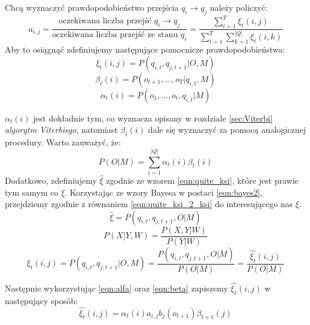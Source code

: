 \documentclass[shortabstract, mgr]{iithesis}
\begin{document}
	   Chcą wyznaczyć prawdopodobieństwo przejścia $q_i \rightarrow q_j$ należy policzyć:
	   \begin{equation}
		    a_{i,j}=\frac{\text{oczekiwana liczba przejść } q_i \rightarrow q_j}{\text{oczekiwana liczba przejść ze stanu } q_i} = \frac{\sum_{t=1}^T 	\xi_t(i,j)}{\sum_{t=1}^T \sum_{k=1}^{|Q|}	\xi_t(i,k)}
		    \label{eqn:qi_qj}
	   \end{equation}
	   Aby to osiągnąć zdefiniujemy następujące pomocnicze prawdopodobieństwa:
	   \begin{equation}
			\xi_t(i,j)=P(q_{i,t}, q_{j,t+1}|O,M)
			\label{eqn:ksi}
	   \end{equation}
	   \begin{equation}
	   	    \beta_t(i)=P(o_{t+1}, \ldots, o_T|q_{i,t},M)
	   	    \label{eqn:beta}
	   \end{equation}
	   \begin{equation}
			\alpha_t(i)=P(o_1, \ldots, o_{t},q_{i,t}|M)
			\label{eqn:alfa}
	   \end{equation}
	   
	   $\alpha_t(i)$ jest dokładnie tym, co wyznacza opisany w rozdziale \ref{sec:Viterbi} \textit{algorytm Viterbiego}, natomiast $\beta_t(i)$ dale się wyznaczyć za pomocą analogicznej procedury. Warto zauważyć, że:
	   \begin{equation}
		   P(O|M) = \sum_{i=1}^{|Q|}\alpha_t(i)\beta_t(i)
	   \end{equation}
	   Dodatkowo, zdefiniujemy $\hat{\xi}$ zgodnie ze wzorem \ref{eqn:quite_ksi}, które jest prawie tym samym co $\xi$. Korzystając ze wzory Bayesa w postaci \ref{eqn:bayes2}, przejdziemy zgodnie z równaniem \ref{eqn:quite_ksi_2_ksi} do interesującego nas $\xi$.
	   \begin{equation}
	       \hat{\xi} = P(q_{i,t}, q_{j,t+1},O|M)
	       \label{eqn:quite_ksi}
	   \end{equation}
	   \begin{equation}
	        P(X|Y,W) = \frac{P(X,Y|W)}{P(Y|W)}
	        \label{eqn:bayes2}
	   \end{equation}
	   \begin{equation}
			\xi_t(i,j)=P(q_{i,t}, q_{j,t+1}|O,M) = \frac{P(q_{i,t}, q_{j,t+1},O|M)}{P(O|M)}= \frac{\hat{\xi_t}(i,j)}{P(O|M)}
			\label{eqn:quite_ksi_2_ksi}
		\end{equation}
		
		Następnie wykorzystując \ref{eqn:alfa} oraz \ref{eqn:beta} zapiszemy $\hat{\xi_t}(i,j)$ w następujący sposób:
		\begin{equation}
			\hat{\xi_t}(i,j) = \alpha_t(i) a_{i,j} b_j(o_{t+1}) \beta_{t+1}(j)
		\end{equation}
		
\end{document}

